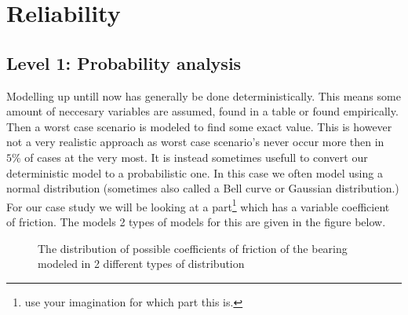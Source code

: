 \documentclass[11pt, a4paper]{article}
\numberwithin{equation}{section}
\numberwithin{figure}{section}
\begin{document}
\setcounter{section}{1}

\section{Reliability}


\subsection{Level 1: Probability analysis}
Modelling up untill now has generally be done deterministically. This means some amount of neccesary variables are assumed, found in a table or found empirically. Then a worst case scenario is modeled to find some exact value. This is however not a very realistic approach as worst case scenario's never occur more then in $5\%$ of cases at the very most. It is instead sometimes usefull to convert our deterministic model to a probabilistic one. In this case we often model using a normal distribution (sometimes also called a Bell curve or Gaussian distribution.)\\
For our case study we will be looking at a part\footnote{use your imagination for which part this is.} which has a variable coefficient of friction. The models 2 types of models for this are given in the figure below.
\begin{figure}[h]
  \centering
  \qquad
  \caption{The distribution of possible coefficients of friction of the bearing modeled in 2 different types of distribution}
\end{figure}
\end{document}
